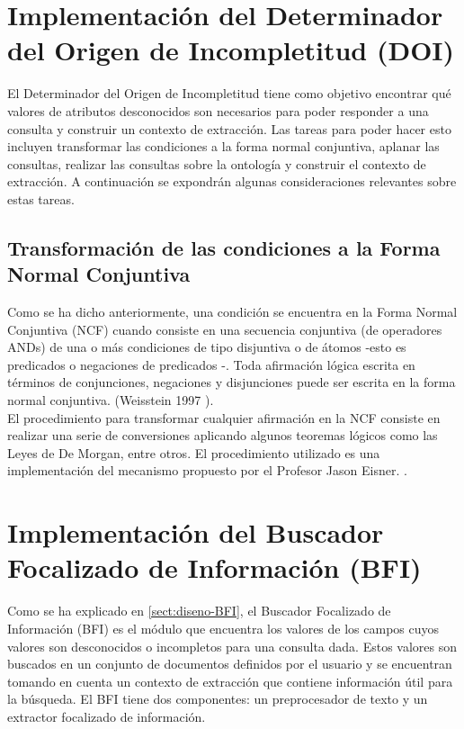 \section{Implementación del Determinador del Origen de Incompletitud (DOI)}\label{sect:implementacion-DOI}

El Determinador del Origen de Incompletitud tiene como objetivo encontrar qué valores de atributos desconocidos son necesarios para poder responder a una consulta y construir un contexto de extracción. Las tareas para poder hacer esto incluyen transformar las condiciones a la forma normal conjuntiva, aplanar las consultas, realizar las consultas sobre la ontología y construir el contexto de extracción. A continuación se expondrán algunas consideraciones relevantes sobre estas tareas. \\ 

\subsection{Transformación de las condiciones a la Forma Normal Conjuntiva}

Como se ha dicho anteriormente, una condición se encuentra en la Forma Normal Conjuntiva (NCF) \cite{normalConjunctiveForm} cuando consiste en una secuencia conjuntiva (de operadores ANDs) de una o más condiciones de tipo disjuntiva o de átomos -esto es predicados o negaciones de predicados -. Toda afirmación lógica escrita en términos de conjunciones, negaciones y disjunciones puede ser escrita en la forma normal conjuntiva. (Weisstein 1997 \cite{normalConjunctiveForm}). \\

El procedimiento para transformar cualquier afirmación en la NCF consiste en realizar una serie de conversiones aplicando algunos teoremas lógicos como las Leyes de De Morgan, entre otros. El procedimiento utilizado es una implementación del mecanismo propuesto por el Profesor Jason Eisner. \cite{normalConjunctiveFormImplementation}. \\

\section{Implementación del Buscador Focalizado de Información (BFI)}\label{sect:implementacion-BFI}

Como se ha explicado en \ref{sect:diseno-BFI}, el Buscador Focalizado de Información (BFI) es el módulo que encuentra los valores de los campos cuyos valores son desconocidos o incompletos para una consulta dada. Estos valores son buscados en un conjunto de documentos definidos por el usuario y se encuentran tomando en cuenta un contexto de extracción que contiene información útil para la búsqueda. El BFI tiene dos componentes: un preprocesador de texto y un extractor focalizado de información. \\

